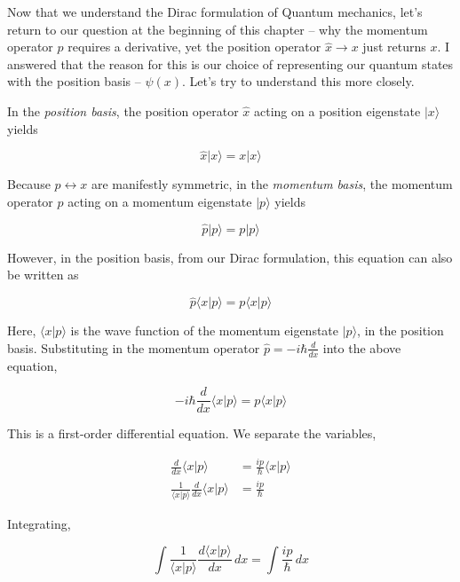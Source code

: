 Now that we understand the Dirac formulation of Quantum mechanics, let's return
to our question at the beginning of this chapter -- why the momentum operator
$\hat{p}$ requires a derivative, yet the position operator $\hat{x} \rightarrow
x$ just returns $x$. I answered that the reason for this is our choice of
representing our quantum states with the position basis -- $\psi(x)$. Let's
try to understand this more closely. 


In the \textit{position basis}, the position operator $\hat{x}$ acting on a position
eigenstate $|x\rangle$ yields 

\[
\hat{x}|x\rangle = x |x\rangle
\] \vspace{3px}

Because  $p \leftrightarrow x$ are manifestly symmetric, in the
\textit{momentum basis}, the momentum operator $\hat{p}$ acting on a momentum
eigenstate $|p\rangle$ yields

\[
\hat{p}|p\rangle = p|p\rangle
\] \vspace{3px}

However, in the position basis, from our Dirac formulation, this equation can
also be written as 

\[
\hat{p} \langle x | p \rangle = p\langle x|p \rangle 
\] \vspace{3px}

Here, $\langle x|p \rangle $ is the wave function of the momentum eigenstate
$|p\rangle$, in the position basis. Substituting in the momentum operator
$\hat{p} = -i\hbar \frac{d }{d x} $ into the above equation, 

\[
-i\hbar \frac{d }{d x} \langle x|p \rangle = p\langle x|p \rangle 
\] \vspace{3px}

This is a first-order differential equation. We separate the variables, 

\begin{align}
  \frac{d }{d x} \langle x|p \rangle &= \frac{ip}{\hbar}\langle x |p \rangle
  \\
  \frac{1}{\langle x|p \rangle } \frac{d }{d x}  \langle x|p \rangle
                                     &= \frac{ip}{\hbar}
\end{align} \vspace{3px}

Integrating, 

\[
\int \frac{1}{\langle x|p \rangle } \frac{d \langle x|p \rangle }{d x} \, dx
= \int \frac{ip}{\hbar} \, dx 
\] \vspace{3px}

